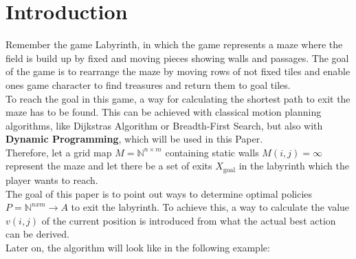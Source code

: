 \documentclass[conference]{IEEEtran}
\begin{document}
\section{Introduction}
Remember the game Labyrinth, in which the game represents a maze where the field is build up by fixed and moving pieces showing walls and passages. The goal of the game is to rearrange the maze by moving rows of not fixed tiles and enable ones game character to find treasures and return them to goal tiles.
\\
To reach the goal in this game, a way for calculating the shortest path to exit the maze has to be found. This can be achieved with classical motion planning algorithms, like Dijkstras Algorithm or Breadth-First Search, but also with \textbf{Dynamic Programming}, which will be used in this Paper.
\\
Therefore, let a grid map $M=\mathbb{N}^{n \times m}$ containing static walls $M(i,j)=\infty$ represent the maze and let there be a set of exits $X_\text{goal}$ in the labyrinth which the player wants to reach.
\\
The goal of this paper is to point out ways to determine optimal policies $P=\mathbb{N}^{nxm}\rightarrow A$ to exit the labyrinth. To achieve this, a way to calculate the value $v(i,j)$ of the current position is introduced from what the actual best action can be derived.\\
Later on, the algorithm will look like in the following example:
\end{document}
